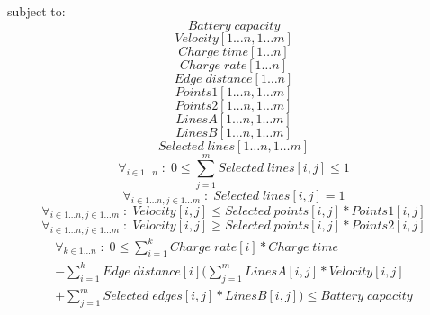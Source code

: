subject to:
\begin{equation}
Battery\;capacity
\end{equation}
\begin{equation}
Velocity[1 \dots n,1 \dots m]
\end{equation}
\begin{equation}
Charge\;time[1 \dots n]
\end{equation}
\begin{equation}
Charge\;rate[1 \dots n]
\end{equation}
\begin{equation}
Edge\;distance[1 \dots n]
\end{equation}
\begin{equation}
Points1[1 \dots n,1 \dots m]
\end{equation}
\begin{equation}
Points2[1 \dots n,1 \dots m]
\end{equation}
\begin{equation}
LinesA[1 \dots n,1 \dots m]
\end{equation}
\begin{equation}
LinesB[1 \dots n,1 \dots m]
\end{equation}
\begin{equation}
Selected\;lines[1 \dots n,1 \dots m]
\end{equation}
\begin{equation}
\forall_{i\in1 \dots n }\;:\;0\le \sum_{j=1}^{m} Selected\;lines[i,j] \le 1
\end{equation}
\begin{equation}
\forall_{i\in1 \dots n, j \in 1 \dots m} \;:\; Selected\;lines[i,j] = 1
\end{equation}
\begin{equation}
\forall_{i\in1 \dots n, j \in 1 \dots m}\;:\;Velocity[i,j] \le Selected\;points[i,j] * Points1[i,j]
\end{equation}
\begin{equation}
\forall_{i\in1 \dots n, j \in 1 \dots m}\;:\;Velocity[i,j] \ge Selected\;points[i,j] * Points2[i,j]
\end{equation}
\begin{equation}
\begin{split}
\forall_{k\in1 \dots n}\;:\;0 \le\sum_{i=1}^{k}Charge\;rate[i]*Charge\;time\\
-\sum_{i=1}^{k} Edge\; distance[i](\sum_{j=1}^{m} LinesA[i,j]*Velocity[i,j]\\
+\sum_{j=1}^{m} Selected\;edges[i,j]*LinesB[i,j]) \le Battery\;capacity
\end{split}
\end{equation}